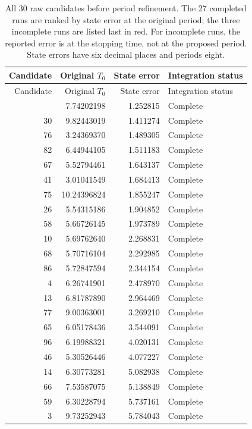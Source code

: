 \begingroup
\small
\setlength{\tabcolsep}{4pt}
\begin{longtable}{rrrl}
\caption{All 30 raw candidates before period refinement. The 27 completed runs are ranked by state error at the original period; the three incomplete runs are listed last in red. For incomplete runs, the reported error is at the stopping time, not at the proposed period. State errors have six decimal places and periods eight.}
\label{tab:best-raw-candidates}\\
\toprule
Candidate & Original $T_0$ & State error & Integration status \\
\midrule
\endfirsthead
\toprule
Candidate & Original $T_0$ & State error & Integration status \\
\midrule
\endhead
\bottomrule
\endfoot
21 & 7.74202198 & 1.252815 & Complete \\
30 & 9.82443019 & 1.411274 & Complete \\
76 & 3.24369370 & 1.489305 & Complete \\
82 & 6.44944105 & 1.511183 & Complete \\
67 & 5.52794461 & 1.643137 & Complete \\
41 & 3.01041549 & 1.684413 & Complete \\
75 & 10.24396824 & 1.855247 & Complete \\
26 & 5.54315186 & 1.904852 & Complete \\
58 & 5.66726145 & 1.973789 & Complete \\
10 & 5.69762640 & 2.268831 & Complete \\
68 & 5.70716104 & 2.292985 & Complete \\
86 & 5.72847594 & 2.344154 & Complete \\
4 & 6.26741901 & 2.478970 & Complete \\
13 & 6.81787890 & 2.964469 & Complete \\
77 & 9.00363001 & 3.269210 & Complete \\
65 & 6.05178436 & 3.544091 & Complete \\
96 & 6.19988321 & 4.020131 & Complete \\
46 & 5.30526446 & 4.077227 & Complete \\
14 & 6.30773281 & 5.082938 & Complete \\
66 & 7.53587075 & 5.138849 & Complete \\
59 & 6.30228794 & 5.737161 & Complete \\
3 & 9.73252943 & 5.784043 & Complete \\

\end{longtable}
